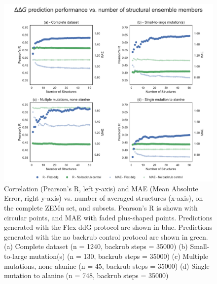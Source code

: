 \begin{figure}
  \includegraphics[width=\textwidth,keepaspectratio]{structs-v-corr-id-zemu-12-60000-rscript-validated-t14.pdf}
  \caption[]{ %
    Correlation (Pearson's R, left y-axis) and MAE (Mean Absolute Error, right y-axis) vs. number of averaged structures (x-axis), on the complete ZEMu set, and subsets.
    Pearson's R is shown with circular points, and MAE with faded plus-shaped points.
    Predictions generated with the Flex ddG protocol are shown in blue.
    Predictions generated with the no backrub control protocol are shown in green.
    (a) Complete dataset (n = 1240, backrub steps = 35000)
    (b) Small-to-large mutation(s) (n = 130, backrub steps = 35000)
    (c) Multiple mutations, none alanine (n = 45, backrub steps = 35000)
    (d) Single mutation to alanine (n = 748, backrub steps = 35000)
  } \label{fig:structs-v-corr-id-zemu-12-60000-rscript-validated-t14}
\end{figure}
